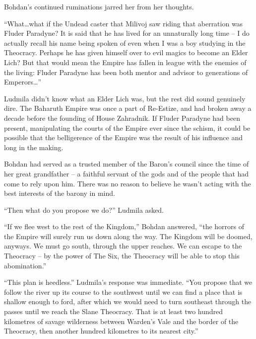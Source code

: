  

Bohdan’s continued ruminations jarred her from her thoughts.

 

“What…what if the Undead caster that Milivoj saw riding that aberration was Fluder Paradyne? It is said that he has lived for an unnaturally long time – I do actually recall his name being spoken of even when I was a boy studying in the Theocracy. Perhaps he has given himself over to evil magics to become an Elder Lich? But that would mean the Empire has fallen in league with the enemies of the living: Fluder Paradyne has been both mentor and advisor to generations of Emperors…”

 

Ludmila didn’t know what an Elder Lich was, but the rest did sound genuinely dire. The Baharuth Empire was once a part of Re-Estize, and had broken away a decade before the founding of House Zahradnik. If Fluder Paradyne had been present, manipulating the courts of the Empire ever since the schism, it could be possible that the belligerence of the Empire was the result of his influence and long in the making.

 

Bohdan had served as a trusted member of the Baron's council since the time of her great grandfather – a faithful servant of the gods and of the people that had come to rely upon him. There was no reason to believe he wasn’t acting with the best interests of the barony in mind.

 

“Then what do you propose we do?” Ludmila asked.

 

“If we flee west to the rest of the Kingdom,” Bohdan answered, “the horrors of the Empire will surely run us down along the way. The Kingdom will be doomed, anyways. We must go south, through the upper reaches. We can escape to the Theocracy – by the power of The Six, the Theocracy will be able to stop this abomination.”

 

“This plan is heedless.” Ludmila’s response was immediate. “You propose that we follow the river up its course to the southwest until we can find a place that is shallow enough to ford, after which we would need to turn southeast through the passes until we reach the Slane Theocracy. That is at least two hundred kilometres of savage wilderness between Warden’s Vale and the border of the Theocracy, then another hundred kilometres to its nearest city.”

